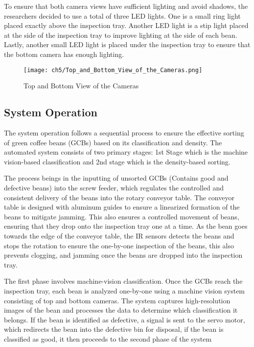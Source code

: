 To ensure that both camera views have sufficient lighting and avoid shadows, the researchers decided to use a total of three LED lights. One is a small ring light placed exactly above the inspection tray. Another LED light is a stip light placed at the side of the inspection tray to improve lighting at the side of each bean. Lastly, another small LED light is placed under the inspection tray to ensure that the bottom camera has enough lighting. 


\begin{figure}[H]
    \centering
    \texttt{[image: ch5/Top\_and\_Bottom\_View\_of\_the\_Cameras.png]}
    \caption{Top and Bottom View of the Cameras}
    \label{fig:top_and_bottom}
\end{figure}

\subsection{System Operation}

The system operation follows a sequential process to ensure the effective sorting of green coffee beans (GCBs) based on its classification and density. The automated system consists of two primary stages: 1st Stage which is the machine vision-based classification and 2nd stage which is the density-based sorting.

The process beings in the inputting of unsorted GCBs (Contains good and defective beans) into the screw feeder, which regulates the controlled and consistent delivery of the beans into the rotary conveyor table. The conveyor table is designed with aluminum guides to ensure a linearized formation of the beans to mitigate jamming. This also ensures a controlled movement of beans, ensuring that they drop onto the inspection tray one at a time. As the bean goes towards the edge of the conveyor table, the IR sensors detects the beans and stops the rotation to ensure the one-by-one inspection of the beans, this also prevents clogging, and jamming once the beans are dropped into the inspection tray. 

The first phase involves machine-vision classification. Once the GCBs reach the inspection tray, each bean is analyzed one-by-one using a machine vision system consisting of top and bottom cameras. The system captures high-resolution images of the bean and processes the data to determine which classification it belongs. If the bean is identified as defective, a signal is sent to the servo motor, which redirects the bean into the defective bin for disposal, if the bean is classified as good, it then proceeds to the second phase of the system

